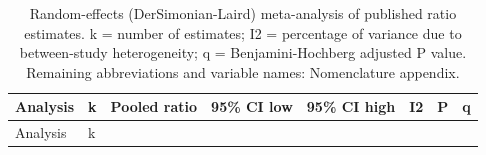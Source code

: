 \documentclass[
  11pt,
]{article}
\begin{document}
\begin{longtable}[]{@{}
  >{\raggedright\arraybackslash}p{}
  >{\raggedright\arraybackslash}p{}
  >{\raggedright\arraybackslash}p{}
  >{\raggedright\arraybackslash}p{}
  >{\raggedright\arraybackslash}p{}
  >{\raggedright\arraybackslash}p{}
  >{\raggedright\arraybackslash}p{}
  >{\raggedright\arraybackslash}p{}@{}}
\caption{Random-effects (DerSimonian-Laird) meta-analysis of published
ratio estimates. k = number of estimates; I2 = percentage of variance
due to between-study heterogeneity; q = Benjamini-Hochberg adjusted P
value. Remaining abbreviations and variable names: Nomenclature
appendix.}\tabularnewline
\toprule\noalign{}
\begin{minipage}[b]{\linewidth}\raggedright
Analysis
\end{minipage} & \begin{minipage}[b]{\linewidth}\raggedright
k
\end{minipage} & \begin{minipage}[b]{\linewidth}\raggedright
Pooled ratio
\end{minipage} & \begin{minipage}[b]{\linewidth}\raggedright
95\% CI low
\end{minipage} & \begin{minipage}[b]{\linewidth}\raggedright
95\% CI high
\end{minipage} & \begin{minipage}[b]{\linewidth}\raggedright
I2
\end{minipage} & \begin{minipage}[b]{\linewidth}\raggedright
P
\end{minipage} & \begin{minipage}[b]{\linewidth}\raggedright
q
\end{minipage} \\
\midrule\noalign{}
\endfirsthead
\toprule\noalign{}
\begin{minipage}[b]{\linewidth}\raggedright
Analysis
\end{minipage} & \begin{minipage}[b]{\linewidth}\raggedright
k
\end{minipage} & \begin{minipage}[b]{\linewidth}\raggedright

\end{minipage}
\end{longtable}
\end{document}
